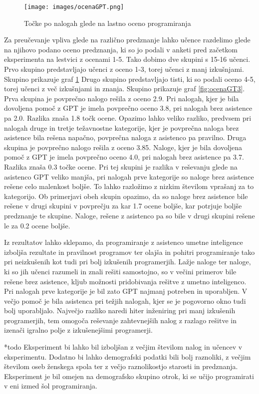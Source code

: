 \documentclass[a4paper,12pt,openright]{book}
\begin{document}
\pagebreak

\begin{figure}[H]
    \centering
    \texttt{[image: images/ocenaGPT.png]}
    \caption{Točke po nalogah glede na lastno oceno programiranja}
    \label{fig:ocenaLTE13}
\end{figure}

Za preučevanje vpliva glede na različno predznanje lahko učence razdelimo glede na njihovo podano oceno predznanja, ki so jo podali v anketi pred začetkom eksperimenta na lestvici z ocenami 1-5. Tako dobimo dve skupini s 15-16 učenci. Prvo skupino predstavljajo učenci z oceno 1-3, torej učenci z manj izkušnjami. Skupino prikazuje graf \ref{fig:ocenaLTE13} Drugo skupino predstavljajo tisti, ki so podali oceno 4-5, torej učenci z več izkušnjami in znanja. Skupino prikazuje graf \ref{fig:ocenaGT3}.
Prva skupina je povprečno nalogo rešila z oceno 2.9. Pri nalogah, kjer je bila dovoljena pomoč z GPT je imela povprečno oceno 3.8, pri nalogah brez asistence pa 2.0. Razlika znaša 1.8 točk ocene. Opazimo lahko veliko razliko, predvsem pri nalogah druge in tretje težavnostne kategorije, kjer je povprečna naloga brez asistence bila rešena napačno, povprečna naloga z asistenco pa pravilno.
Druga skupina je povprečno nalogo rešila z oceno 3.85. Naloge, kjer je bila dovoljena pomoč z GPT je imela povprečno oceno 4.0, pri nalogah brez asistence pa 3.7. Razlika znaša 0.3 točke ocene. Pri tej skupini je razlika v reševanju glede na asistenco GPT veliko manjša, pri nalogah prve kategorije so naloge brez asistence rešene celo malenkost boljše. To lahko razložimo z nizkim številom vprašanj za to kategorijo.
Ob primerjavi obeh skupin opazimo, da so naloge brez asistence bile rešene v drugi skupini v povprečju za kar 1.7 ocene boljše, kar potrjuje boljše predznanje te skupine. Naloge, rešene z asistenco pa so bile v drugi skupini rešene le za 0.2 ocene boljše.

Iz rezultatov lahko sklepamo, da programiranje z asistenco umetne inteligence izboljša rezultate in pravilnost programov ter olajša in pohitri programiranje tako pri neizkušenih kot tudi pri bolj izkušenih programerjih. Lažje naloge ter naloge, ki so jih učenci razumeli in znali rešiti samostojno, so v večini primerov bile rešene brez asistence, kljub možnosti pridobivanja rešitve z umetno inteligenco. Pri nalogah prve kategorije je bil zato GPT najmanj potreben in uporabljen. V večjo pomoč je bila asistenca pri težjih nalogah, kjer se je pogovorno okno tudi bolj uporabljalo. Največjo razliko naredi hiter inženiring pri manj izkušenih programerjih, tem omogoča reševanje zahtevnejših nalog z razlago rešitve in izenači igralno polje z izkušenejšimi programerji.


*todo
Eksperiment bi lahko bil izboljšan z večjim številom nalog in učencev v eksperimentu. Dodatno bi lahko demografski podatki bili bolj raznoliki, z večjim številom oseb ženskega spola ter z večjo raznolikostjo starosti in predznanja. Eksperiment je bil omejen na demografsko skupino otrok, ki se učijo programirati v eni izmed šol programiranja.

\printbibliography[heading=bibintoc,title={Literatura}]
\end{document}
